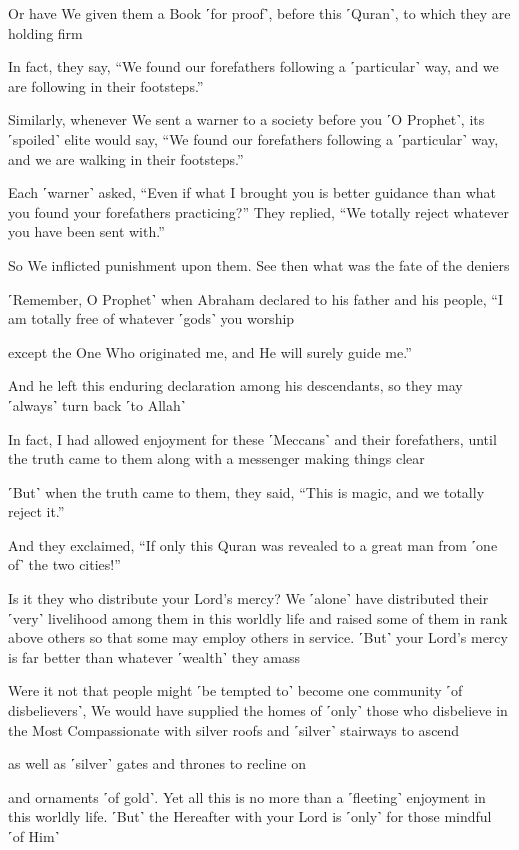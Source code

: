 Or have We given them a Book ˹for proof˺, before this ˹Quran˺, to which they are holding firm

In fact, they say, “We found our forefathers following a ˹particular˺ way, and we are following in their footsteps.”

Similarly, whenever We sent a warner to a society before you ˹O Prophet˺, its ˹spoiled˺ elite would say, “We found our forefathers following a ˹particular˺ way, and we are walking in their footsteps.”

Each ˹warner˺ asked, “Even if what I brought you is better guidance than what you found your forefathers practicing?” They replied, “We totally reject whatever you have been sent with.”

So We inflicted punishment upon them. See then what was the fate of the deniers

˹Remember, O Prophet˺ when Abraham declared to his father and his people, “I am totally free of whatever ˹gods˺ you worship

except the One Who originated me, and He will surely guide me.”

And he left this enduring declaration among his descendants, so they may ˹always˺ turn back ˹to Allah˺

In fact, I had allowed enjoyment for these ˹Meccans˺ and their forefathers, until the truth came to them along with a messenger making things clear

˹But˺ when the truth came to them, they said, “This is magic, and we totally reject it.”

And they exclaimed, “If only this Quran was revealed to a great man from ˹one of˺ the two cities!”

Is it they who distribute your Lord’s mercy? We ˹alone˺ have distributed their ˹very˺ livelihood among them in this worldly life and raised some of them in rank above others so that some may employ others in service. ˹But˺ your Lord’s mercy is far better than whatever ˹wealth˺ they amass

Were it not that people might ˹be tempted to˺ become one community ˹of disbelievers˺, We would have supplied the homes of ˹only˺ those who disbelieve in the Most Compassionate with silver roofs and ˹silver˺ stairways to ascend

as well as ˹silver˺ gates and thrones to recline on

and ornaments ˹of gold˺. Yet all this is no more than a ˹fleeting˺ enjoyment in this worldly life. ˹But˺ the Hereafter with your Lord is ˹only˺ for those mindful ˹of Him˺

